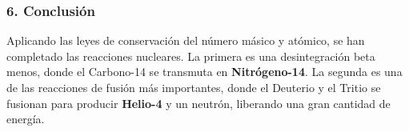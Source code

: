 \subsubsection*{6. Conclusión}
\begin{cajaconclusion}
    Aplicando las leyes de conservación del número másico y atómico, se han completado las reacciones nucleares. La primera es una desintegración beta menos, donde el Carbono-14 se transmuta en \textbf{Nitrógeno-14}. La segunda es una de las reacciones de fusión más importantes, donde el Deuterio y el Tritio se fusionan para producir \textbf{Helio-4} y un neutrón, liberando una gran cantidad de energía.
\end{cajaconclusion}

\newpage
